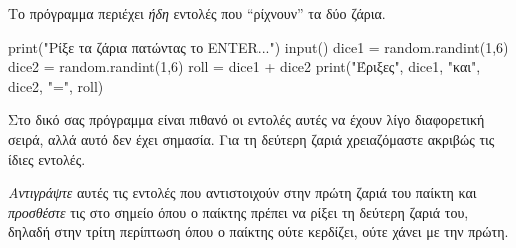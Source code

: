 \documentclass[a4paper,11pt,oneside]{book}
\begin{document}
\begin{step}
Το πρόγραμμα περιέχει \emph{ήδη} εντολές που ``ρίχνουν'' τα δύο ζάρια. 

\begin{pyplain}
print("Ρίξε τα ζάρια πατώντας το ENTER...")
input()
dice1 = random.randint(1,6)
dice2 = random.randint(1,6)
roll = dice1 + dice2
print("Έριξες", dice1, "και", dice2, "=", roll)
\end{pyplain}

Στο δικό σας πρόγραμμα είναι πιθανό οι εντολές αυτές να έχουν λίγο διαφορετική σειρά, αλλά αυτό δεν έχει σημασία. Για τη δεύτερη ζαριά χρειαζόμαστε ακριβώς τις ίδιες εντολές.

\emph{Αντιγράψτε} αυτές τις εντολές που αντιστοιχούν στην πρώτη ζαριά του παίκτη και \emph{προσθέστε} τις στο σημείο όπου ο παίκτης πρέπει να ρίξει τη δεύτερη ζαριά του, δηλαδή στην τρίτη περίπτωση όπου ο παίκτης ούτε κερδίζει, ούτε χάνει με την πρώτη.




\end{step}
\end{document}
